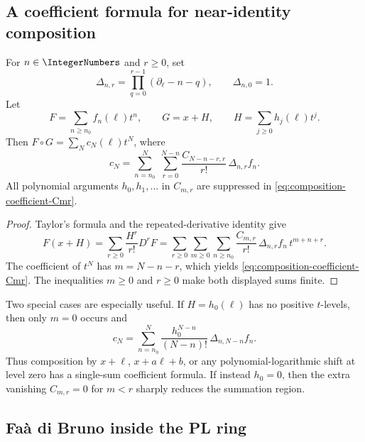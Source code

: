 \documentclass[11pt,oneside]{article}
\numberwithin{equation}{section}
\theoremstyle{definition}
\begin{document}
\subsection{A coefficient formula for near-identity composition}

For \(n\in\IntegerNumbers\) and \(r\ge0\), set
\begin{equation}\label{eq:Delta-nr-app}
  \Delta_{n,r}
  =\prod_{q=0}^{r-1}(\partial_\ell-n-q),
  \qquad \Delta_{n,0}=1.
\end{equation}
Let
\[
  F=\sum_{n\ge n_0}f_n(\ell)t^n,
  \qquad G=x+H,
  \qquad H=\sum_{j\ge0}h_j(\ell)t^j.
\]
Then \(F\circ G=\sum_N c_N(\ell)t^N\), where
\begin{equation}\label{eq:composition-coefficient-Cmr}
\boxed{
  c_N=
  \sum_{n=n_0}^{N}\;
  \sum_{r=0}^{N-n}
    \frac{C_{N-n-r,r}}{r!}\,
    \Delta_{n,r}f_n.
}
\end{equation}
All polynomial arguments \(h_0,h_1,\ldots\) in \(C_{m,r}\) are suppressed in
\eqref{eq:composition-coefficient-Cmr}.

\begin{proof}
Taylor's formula and the repeated-derivative identity give
\[
  F(x+H)
  =\sum_{r\ge0}\frac{H^r}{r!}D^rF
  =\sum_{r\ge0}\sum_{m\ge0}\sum_{n\ge n_0}
     \frac{C_{m,r}}{r!}\,
     \Delta_{n,r}f_n\,t^{m+n+r}.
\]
The coefficient of \(t^N\) has \(m=N-n-r\), which yields
\eqref{eq:composition-coefficient-Cmr}.  The inequalities \(m\ge0\) and
\(r\ge0\) make both displayed sums finite.
\end{proof}

Two special cases are especially useful.  If \(H=h_0(\ell)\) has no positive
\(t\)-levels, then only \(m=0\) occurs and
\begin{equation}\label{eq:composition-pure-log-shift}
  c_N=\sum_{n=n_0}^{N}
    \frac{h_0^{N-n}}{(N-n)!}\,
    \Delta_{n,N-n}f_n.
\end{equation}
Thus composition by \(x+\ell\), \(x+a\ell+b\), or any polynomial-logarithmic
shift at level zero has a single-sum coefficient formula.  If instead
\(h_0=0\), then the extra vanishing \(C_{m,r}=0\) for \(m<r\) sharply reduces
the summation region.

\subsection{Fa\`a di Bruno inside the PL ring}
\end{document}
